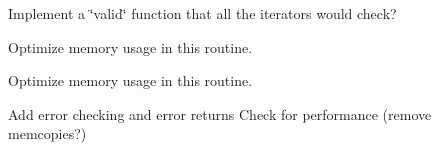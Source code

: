 
\begin{DoxyRefList}
\item[\label{todo__todo000001}%
\hypertarget{todo__todo000001}{}%
Member \hyperlink{bvgraph_8c_a31308c861752f08792a4482bca9cc9ef}{bvgraph\+\_\+close} (bvgraph $\ast$g)]Implement a \char`\"{}valid\char`\"{} function that all the iterators would check? 
\item[\label{todo__todo000003}%
\hypertarget{todo__todo000003}{}%
Member \hyperlink{bvgraph__iterator_8c_a9fb3d24d9bc7fcd045b64b0d38c0d0fb}{bvgraph\+\_\+iterator\+\_\+next} (bvgraph\+\_\+iterator $\ast$iter)]Optimize memory usage in this routine. 
\item[\label{todo__todo000003}%
\hypertarget{todo__todo000003}{}%
Member \hyperlink{bvgraph__iterator_8c_a9fb3d24d9bc7fcd045b64b0d38c0d0fb}{bvgraph\+\_\+iterator\+\_\+next} (bvgraph\+\_\+iterator $\ast$iter)]Optimize memory usage in this routine. 
\item[\label{todo__todo000002}%
\hypertarget{todo__todo000002}{}%
Member \hyperlink{bvgraph__iterator_8c_abb9e6af465a17ca110ca4194ff37b9dd}{bvgraph\+\_\+nonzero\+\_\+iterator} (bvgraph $\ast$g, bvgraph\+\_\+iterator $\ast$i)]Add error checking and error returns Check for performance (remove memcopies?) 
\end{DoxyRefList}